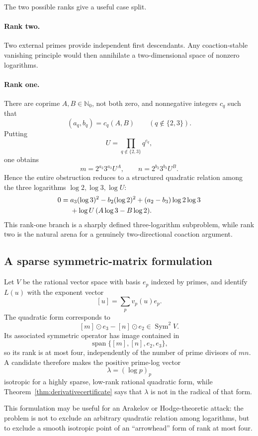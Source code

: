 \documentclass[11pt,oneside]{article}
\theoremstyle{definition}
\newcommand{\N}{\mathbb N}
\newcommand{\Span}{\operatorname{span}}
\begin{document}
The two possible ranks give a useful case split.

\paragraph{Rank two.}
Two external primes provide independent first descendants.  Any coaction-stable vanishing principle would then annihilate a two-dimensional space of nonzero logarithms.

\paragraph{Rank one.}
There are coprime $A,B\in\N_0$, not both zero, and nonnegative integers $c_q$ such that
\[
  (a_q,b_q)=c_q(A,B)
  \qquad(q\notin\{2,3\}).
\]
Putting
\[
  U=\prod_{q\notin\{2,3\}}q^{c_q},
\]
one obtains
\[
 m=2^{a_2}3^{a_3}U^A,
 \qquad
 n=2^{b_2}3^{b_3}U^B.
\]
Hence the entire obstruction reduces to a structured quadratic relation among the three logarithms $\log2,\log3,\log U$:
\begin{align}\label{eq:rankonerelation}
0={}&
 a_3(\log3)^2-b_2(\log2)^2
 +(a_2-b_3)\log2\log3\notag\\
&+\log U\,(A\log3-B\log2).
\end{align}
This rank-one branch is a sharply defined three-logarithm subproblem, while rank two is the natural arena for a genuinely two-directional coaction argument.

\subsection{A sparse symmetric-matrix formulation}

Let $V$ be the rational vector space with basis $e_p$ indexed by primes, and identify $L(u)$ with the exponent vector
\[
  [u]=\sum_pv_p(u)e_p.
\]
The quadratic form corresponds to
\[
  [m]\odot e_3-[n]\odot e_2\in\operatorname{Sym}^2V.
\]
Its associated symmetric operator has image contained in
\[
  \Span\{[m],[n],e_2,e_3\},
\]
so its rank is at most four, independently of the number of prime divisors of $mn$.  A candidate therefore makes the positive prime-log vector
\[
  \lambda=(\log p)_p
\]
isotropic for a highly sparse, low-rank rational quadratic form, while Theorem~\ref{thm:derivativecertificate} says that $\lambda$ is not in the radical of that form.

This formulation may be useful for an Arakelov or Hodge-theoretic attack: the problem is not to exclude an arbitrary quadratic relation among logarithms, but to exclude a smooth isotropic point of an ``arrowhead'' form of rank at most four.
\end{document}
